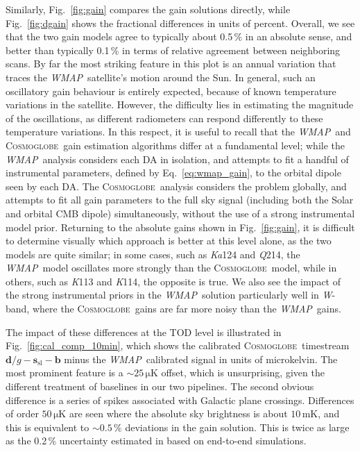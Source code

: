 \documentclass[twocolumn]{../../common/aa}
\def\WMAP{\emph{WMAP}}
\newcommand{\cosmoglobe}{\textsc{Cosmoglobe}}
\newcommand{\K}[0]{\textit K}
\newcommand{\Ka}[0]{\textit{Ka}}
\newcommand{\Q}[0]{\textit Q}
\newcommand{\W}[0]{\textit W}
\begin{document}
Similarly, Fig.~\ref{fig:gain} compares the gain solutions directly, while Fig.~\ref{fig:dgain} shows the fractional differences in units of percent. Overall, we see that the two gain models agree to typically about 0.5\,\% in an absolute sense, and better than typically 0.1\,\% in terms of relative agreement between neighboring scans. By far the most striking feature in this plot is an annual variation that traces the \WMAP\ satellite's motion around the Sun. In general, such an oscillatory gain behaviour is entirely expected, because of known temperature variations in the satellite. However, the difficulty lies in estimating the magnitude of the oscillations, as different radiometers can respond differently to these temperature variations. In this respect, it is useful to recall that the \WMAP\ and \cosmoglobe\ gain estimation algorithms differ at a fundamental level; while the \WMAP\ analysis considers each DA in isolation, and attempts to fit a handful of instrumental parameters, defined by Eq.~\eqref{eq:wmap_gain}, to the orbital dipole seen by each DA. The \cosmoglobe\ analysis considers the problem globally, and attempts to fit all gain parameters to the full sky signal (including both the Solar and orbital CMB dipole) simultaneously, without the use of a strong instrumental model prior. Returning to the absolute gains shown in Fig.~\ref{fig:gain}, it is difficult to determine visually which approach is better at this level alone, as the two models are quite similar; in some cases, such as \Ka124 and \Q214, the \WMAP\ model oscillates more strongly than the \cosmoglobe\ model, while in others, such as \K113 and \K114, the opposite is true. We also see the impact of the strong instrumental priors in the \WMAP\ solution particularly well in \W-band, where the \cosmoglobe\ gains are far more noisy than the \WMAP\ gains. 


The impact of these differences at the TOD level is illustrated in Fig.~\ref{fig:cal_comp_10min}, which shows the calibrated \cosmoglobe\ timestream $\boldsymbol d/g-\boldsymbol s_\mathrm{sl}-\boldsymbol b$ minus the \WMAP\ calibrated signal in units of microkelvin. The most prominent feature is a $\sim25\,\mathrm{\mu K}$ offset, which is unsurprising, given the different treatment of baselines in our two pipelines. The second obvious difference is a series of spikes associated with Galactic plane crossings. Differences of order $50\,\mathrm{\mu K}$ are seen where the absolute sky brightness is about $10\,\mathrm{mK}$, and this is equivalent to $\sim0.5\,\%$ deviations in the gain solution. This is twice as large as the 0.2\,\% uncertainty estimated in \citet{bennett2012} based on end-to-end simulations.
\end{document}
